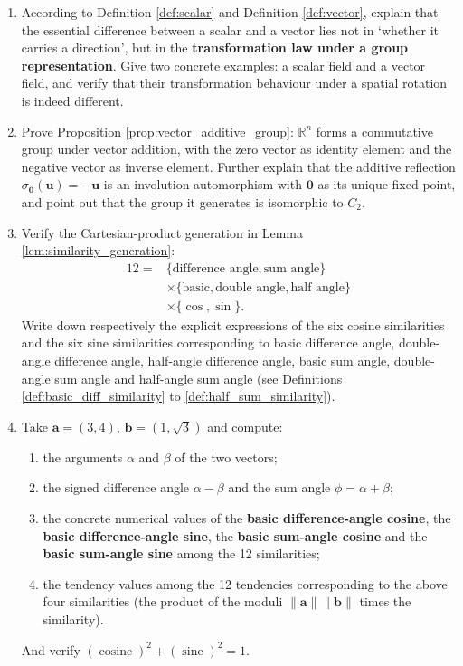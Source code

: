 \begin{enumerate}[leftmargin=3em, label=\textbf{Exercise \arabic*}]
    \item According to Definition \ref{def:scalar} and Definition \ref{def:vector}, explain that the essential difference between a scalar and a vector lies not in `whether it carries a direction',
    but in the \textbf{transformation law under a group representation}. Give two concrete examples: a scalar field and a vector field,
    and verify that their transformation behaviour under a spatial rotation is indeed different.

    \item Prove Proposition \ref{prop:vector_additive_group}: $\mathbb{R}^n$ forms a commutative group under vector addition,
    with the zero vector as identity element and the negative vector as inverse element. Further explain that the additive reflection
    $\sigma_{\mathbf{0}}(\mathbf{u})=-\mathbf{u}$ is an involution automorphism with $\mathbf{0}$ as its unique fixed point,
    and point out that the group it generates is isomorphic to $C_2$.

    \item Verify the Cartesian-product generation in Lemma \ref{lem:similarity_generation}:
    \[
    \begin{aligned}12={}&\{\text{difference angle},\text{sum angle}\}\\&\times\{\text{basic},\text{double angle},\text{half angle}\}\\&\times\{\cos,\sin\}.\end{aligned}
    \]
    Write down respectively the explicit expressions of the six cosine similarities and the six sine similarities
    corresponding to basic difference angle, double-angle difference angle, half-angle difference angle, basic sum angle, double-angle sum angle and half-angle sum angle
    (see Definitions \ref{def:basic_diff_similarity} to \ref{def:half_sum_similarity}).

    \item Take $\mathbf{a}=(3,4)$, $\mathbf{b}=(1,\sqrt{3})$ and compute:
    \begin{enumerate}[label=(\roman*)]
        \item the arguments $\alpha$ and $\beta$ of the two vectors;
        \item the signed difference angle $\alpha-\beta$ and the sum angle $\phi=\alpha+\beta$;
        \item the concrete numerical values of the \textbf{basic difference-angle cosine}, the \textbf{basic difference-angle sine},
              the \textbf{basic sum-angle cosine} and the \textbf{basic sum-angle sine} among the 12 similarities;
        \item the tendency values among the 12 tendencies corresponding to the above four similarities (the product of the moduli $\|\mathbf{a}\|\|\mathbf{b}\|$ times the similarity).
    \end{enumerate}
    And verify $(\operatorname{cosine})^2+(\operatorname{sine})^2=1$.


\end{enumerate}
